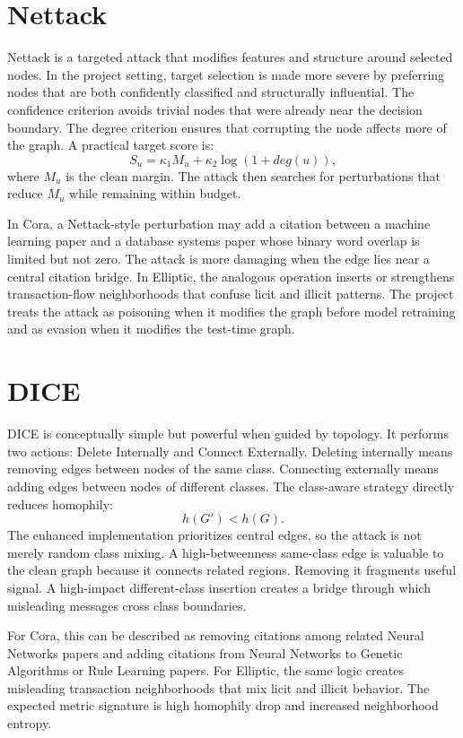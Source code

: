 \documentclass[12pt,oneside]{report}
\begin{document}
\section{Nettack}
Nettack is a targeted attack that modifies features and structure around selected nodes. In the project setting, target selection is made more severe by preferring nodes that are both confidently classified and structurally influential. The confidence criterion avoids trivial nodes that were already near the decision boundary. The degree criterion ensures that corrupting the node affects more of the graph. A practical target score is:
$$
S_u=\kappa_1 M_u+\kappa_2\log(1+deg(u)),
$$
where $M_u$ is the clean margin. The attack then searches for perturbations that reduce $M_u$ while remaining within budget.

In Cora, a Nettack-style perturbation may add a citation between a machine learning paper and a database systems paper whose binary word overlap is limited but not zero. The attack is more damaging when the edge lies near a central citation bridge. In Elliptic, the analogous operation inserts or strengthens transaction-flow neighborhoods that confuse licit and illicit patterns. The project treats the attack as poisoning when it modifies the graph before model retraining and as evasion when it modifies the test-time graph.

\section{DICE}
DICE is conceptually simple but powerful when guided by topology. It performs two actions: Delete Internally and Connect Externally. Deleting internally means removing edges between nodes of the same class. Connecting externally means adding edges between nodes of different classes. The class-aware strategy directly reduces homophily:
$$
h(G')<h(G).
$$
The enhanced implementation prioritizes central edges, so the attack is not merely random class mixing. A high-betweenness same-class edge is valuable to the clean graph because it connects related regions. Removing it fragments useful signal. A high-impact different-class insertion creates a bridge through which misleading messages cross class boundaries.

For Cora, this can be described as removing citations among related Neural Networks papers and adding citations from Neural Networks to Genetic Algorithms or Rule Learning papers. For Elliptic, the same logic creates misleading transaction neighborhoods that mix licit and illicit behavior. The expected metric signature is high homophily drop and increased neighborhood entropy.
\end{document}

